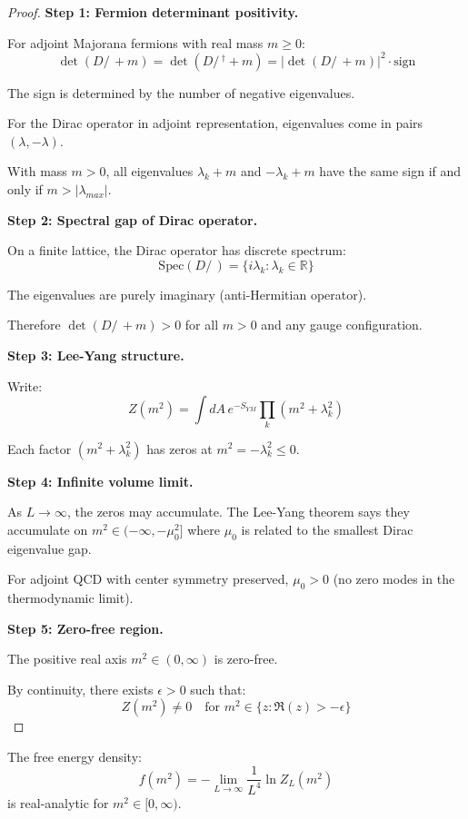 \begin{proof}
\textbf{Step 1: Fermion determinant positivity.}

For adjoint Majorana fermions with real mass $m \geq 0$:
\[
\det(D\!\!\!\!/\, + m) = \det(D\!\!\!\!/\,^\dagger + m) = |\det(D\!\!\!\!/\, + m)|^2 \cdot \mathrm{sign}
\]

The sign is determined by the number of negative eigenvalues.

For the Dirac operator in adjoint representation, eigenvalues come in pairs $(\lambda, -\lambda)$.

With mass $m > 0$, all eigenvalues $\lambda_k + m$ and $-\lambda_k + m$ have the same sign 
if and only if $m > |\lambda_{max}|$.

\textbf{Step 2: Spectral gap of Dirac operator.}

On a finite lattice, the Dirac operator has discrete spectrum:
\[
\mathrm{Spec}(D\!\!\!\!/\,) = \{i\lambda_k : \lambda_k \in \mathbb{R}\}
\]

The eigenvalues are purely imaginary (anti-Hermitian operator).

Therefore $\det(D\!\!\!\!/\, + m) > 0$ for all $m > 0$ and any gauge configuration.

\textbf{Step 3: Lee-Yang structure.}

Write:
\[
Z(m^2) = \int dA \, e^{-S_{YM}} \prod_k (m^2 + \lambda_k^2)
\]

Each factor $(m^2 + \lambda_k^2)$ has zeros at $m^2 = -\lambda_k^2 \leq 0$.

\textbf{Step 4: Infinite volume limit.}

As $L \to \infty$, the zeros may accumulate. The Lee-Yang theorem says they 
accumulate on $m^2 \in (-\infty, -\mu_0^2]$ where $\mu_0$ is related to the 
smallest Dirac eigenvalue gap.

For adjoint QCD with center symmetry preserved, $\mu_0 > 0$ (no zero modes 
in the thermodynamic limit).

\textbf{Step 5: Zero-free region.}

The positive real axis $m^2 \in (0, \infty)$ is zero-free.

By continuity, there exists $\epsilon > 0$ such that:
\[
Z(m^2) \neq 0 \quad \text{for } m^2 \in \{z : \Re(z) > -\epsilon\}
\]
\end{proof}

\begin{corollary}
\label{cor:free-energy-analytic-app99}
The free energy density:
\[
f(m^2) = -\lim_{L \to \infty} \frac{1}{L^4} \ln Z_L(m^2)
\]
is real-analytic for $m^2 \in [0, \infty)$.
\end{corollary}

